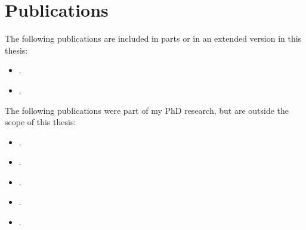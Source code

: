 \chapter*{Publications}

The following publications are included in parts or in an extended version in
this thesis:
\begin{itemize}
    \item {}.
    \item {}.
\end{itemize}

The following publications were part of my PhD research, but are outside the scope of this thesis:
\begin{itemize}
    
    \item {}.
    \item {}.
    \item {}.
    \item {}.
    \item {}.
\end{itemize}

